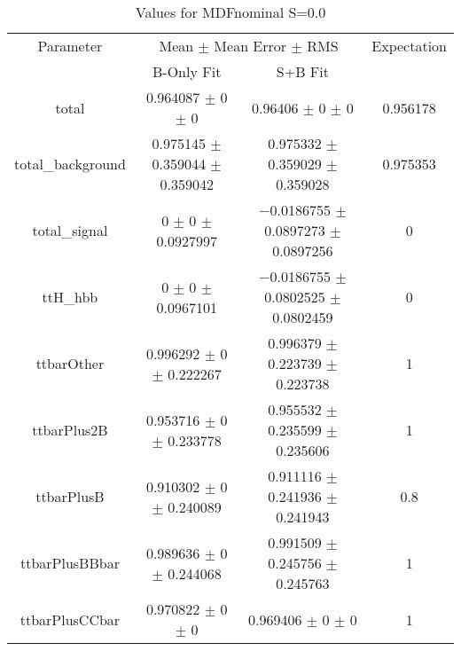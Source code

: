 \begin{table}
\centering
\caption{Values for MDFnominal S=0.0}
\begin{tabular}{cccc}
\toprule
Parameter & \multicolumn{2}{c}{Mean $\pm$ Mean Error $\pm$ RMS} & Expectation\\
 & B-Only Fit & S+B Fit & \\
\midrule
total & \num{0.964087} $\pm$ \num{0} $\pm$ \num{0} & \num{0.96406} $\pm$ \num{0} $\pm$ \num{0} & \num{0.956178}\\
total\_background & \num{0.975145} $\pm$ \num{0.359044} $\pm$ \num{0.359042} & \num{0.975332} $\pm$ \num{0.359029} $\pm$ \num{0.359028} & \num{0.975353}\\
total\_signal & \num{0} $\pm$ \num{0} $\pm$ \num{0.0927997} & \num{-0.0186755} $\pm$ \num{0.0897273} $\pm$ \num{0.0897256} & \num{0}\\
ttH\_hbb & \num{0} $\pm$ \num{0} $\pm$ \num{0.0967101} & \num{-0.0186755} $\pm$ \num{0.0802525} $\pm$ \num{0.0802459} & \num{0}\\
ttbarOther & \num{0.996292} $\pm$ \num{0} $\pm$ \num{0.222267} & \num{0.996379} $\pm$ \num{0.223739} $\pm$ \num{0.223738} & \num{1}\\
ttbarPlus2B & \num{0.953716} $\pm$ \num{0} $\pm$ \num{0.233778} & \num{0.955532} $\pm$ \num{0.235599} $\pm$ \num{0.235606} & \num{1}\\
ttbarPlusB & \num{0.910302} $\pm$ \num{0} $\pm$ \num{0.240089} & \num{0.911116} $\pm$ \num{0.241936} $\pm$ \num{0.241943} & \num{0.8}\\
ttbarPlusBBbar & \num{0.989636} $\pm$ \num{0} $\pm$ \num{0.244068} & \num{0.991509} $\pm$ \num{0.245756} $\pm$ \num{0.245763} & \num{1}\\
ttbarPlusCCbar & \num{0.970822} $\pm$ \num{0} $\pm$ \num{0} & \num{0.969406} $\pm$ \num{0} $\pm$ \num{0} & \num{1}\\
\bottomrule
\end{tabular}
\end{table}